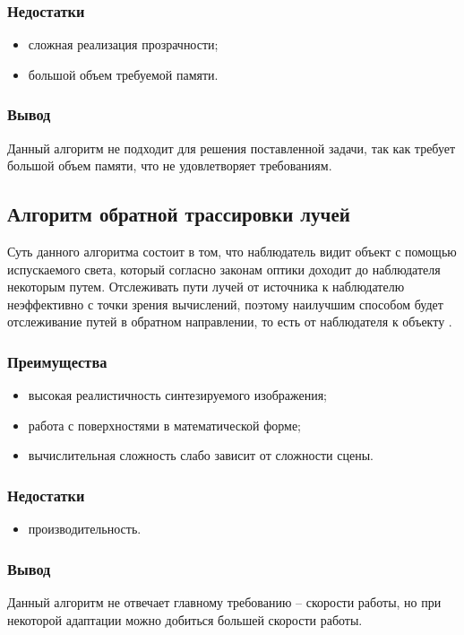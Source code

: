 \subsubsection*{Недостатки}
\begin{itemize}
	\item сложная реализация прозрачности;
	\item большой объем требуемой памяти.
\end{itemize}
\subsubsection*{Вывод}
Данный алгоритм не подходит для решения поставленной задачи, так как требует большой объем памяти, что не удовлетворяет требованиям. 

\subsection{Алгоритм обратной трассировки лучей}
Суть данного алгоритма состоит в том, что наблюдатель видит объект с помощью испускаемого света, который согласно законам оптики доходит до наблюдателя некоторым путем. Отслеживать пути лучей от источника к наблюдателю неэффективно с точки зрения вычислений, поэтому наилучшим способом будет отслеживание путей в обратном направлении, то есть от наблюдателя к объекту \cite{raytrace}.

\subsubsection*{Преимущества}
\begin{itemize}
\item	высокая реалистичность синтезируемого изображения;
\item	работа с поверхностями в математической форме;
\item	вычислительная сложность слабо зависит от сложности сцены.
\end{itemize}

\subsubsection*{Недостатки}
\begin{itemize}
\item	производительность.
\end{itemize}

\subsubsection*{Вывод}
Данный алгоритм не отвечает главному требованию – скорости работы, но при некоторой адаптации можно добиться большей скорости работы. 


